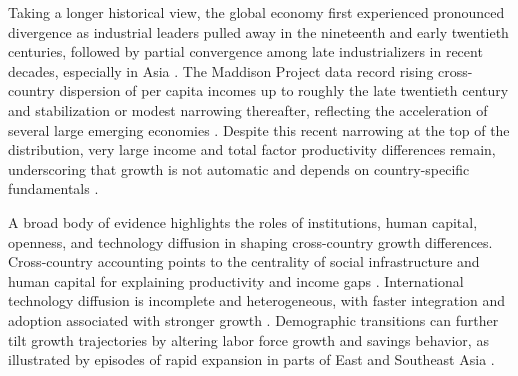 \documentclass[\topdir/lecture\_notes.tex]{subfiles}
\begin{document}
Taking a longer historical view, the global economy first experienced pronounced divergence as industrial leaders pulled away in the nineteenth and early twentieth centuries, followed by partial convergence among late industrializers in recent decades, especially in Asia \parencite{bolt2018rebasing,jones2016facts}.
The Maddison Project data record rising cross-country dispersion of per capita incomes up to roughly the late twentieth century and stabilization or modest narrowing thereafter, reflecting the acceleration of several large emerging economies \parencite{bolt2018rebasing}.
Despite this recent narrowing at the top of the distribution, very large income and total factor productivity differences remain, underscoring that growth is not automatic and depends on country-specific fundamentals \parencite{halljones1999,caselli2005,jones2016facts}.


A broad body of evidence highlights the roles of institutions, human capital, openness, and technology diffusion in shaping cross-country growth differences.
Cross-country accounting points to the centrality of social infrastructure and human capital for explaining productivity and income gaps \parencite{halljones1999,caselli2005,barro1991}.
International technology diffusion is incomplete and heterogeneous, with faster integration and adoption associated with stronger growth \parencite{keller2004,cominhobijn2010,cominmestieri2018}.
Demographic transitions can further tilt growth trajectories by altering labor force growth and savings behavior, as illustrated by episodes of rapid expansion in parts of East and Southeast Asia \parencite{bloomwilliamson1998,jones2016facts}.
\end{document}
